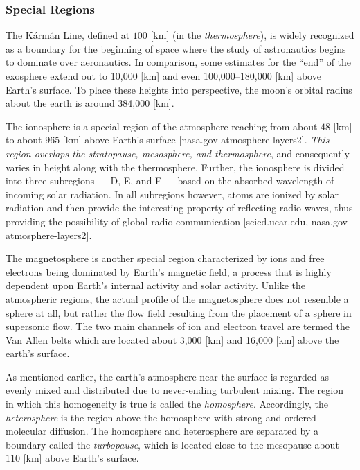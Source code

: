 \documentclass[11pt,dvipsnames]{thesis}
\begin{document}
\subsubsection{Special Regions}
The K\'{a}rm\'{a}n Line, defined at $100$ [\si{\km}] (in the \textit{thermosphere}), is widely recognized as a boundary for the beginning of space where the study of astronautics begins to dominate over aeronautics. In comparison, some estimates for the ``end'' of the exosphere extend out to 10,000 [\si{\km}] and even 100,000--180,000 [\si{\km}] above Earth's surface. To place these heights into perspective, the moon's orbital radius about the earth is around 384,000 [\si{\km}].

The ionosphere is a special region of the atmosphere reaching from about $48$ [\si{\km}] to about $965$ [\si{\km}] above Earth's surface [nasa.gov atmosphere-layers2]. \textit{This region overlaps the stratopause, mesosphere, and thermosphere}, and consequently varies in height along with the thermosphere. Further, the ionosphere is divided into three subregions --- D, E, and F --- based on the absorbed wavelength of incoming solar radiation. In all subregions however, atoms are ionized by solar radiation and then provide the interesting property of reflecting radio waves, thus providing the possibility of global radio communication [scied.ucar.edu, nasa.gov atmosphere-layers2].

The magnetosphere is another special region characterized by ions and free electrons being dominated by Earth's magnetic field, a process that is highly dependent upon Earth's internal activity and solar activity. Unlike the atmospheric regions, the actual profile of the magnetosphere does not resemble a sphere at all, but rather the flow field resulting from the placement of a sphere in supersonic flow. The two main channels of ion and electron travel are termed the Van Allen belts which are located about 3,000 [\si{\km}] and 16,000 [\si{\km}] above the earth's surface.

As mentioned earlier, the earth's atmosphere near the surface is regarded as evenly mixed and distributed due to never-ending turbulent mixing. The region in which this homogeneity is true is called the \textit{homosphere}. Accordingly, the \textit{heterosphere} is the region above the homosphere with strong and ordered molecular diffusion. 
The homosphere and heterosphere are separated by a boundary called the \textit{turbopause}, which is located close to the mesopause about $110$ [\si{\km}] above Earth's surface.
\end{document}
